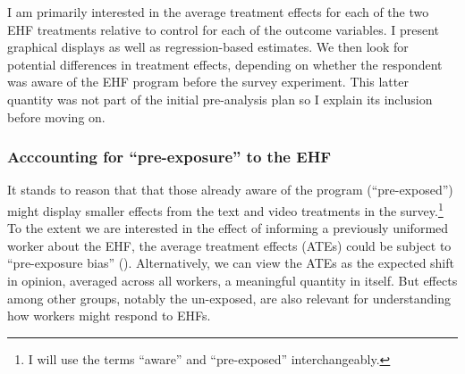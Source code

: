 \documentclass[
  11pt,
  oneside]{article}
\begin{document}
I am primarily interested in the average treatment effects for each of the two EHF treatments relative to control for each of the outcome variables. I present graphical displays as well as regression-based estimates. We then look for potential differences in treatment effects, depending on whether the respondent was aware of the EHF program before the survey experiment. This latter quantity was not part of the initial pre-analysis plan so I explain its inclusion before moving on.

\subsubsection{Acccounting for ``pre-exposure'' to the EHF}\label{acccounting-for-pre-exposure-to-the-ehf}

It stands to reason that that those already aware of the program (``pre-exposed'') might display smaller effects from the text and video treatments in the survey.\footnote{I will use the terms ``aware'' and ``pre-exposed'' interchangeably.} To the extent we are interested in the effect of informing a previously uniformed worker about the EHF, the average treatment effects (ATEs) could be subject to ``pre-exposure bias'' (). Alternatively, we can view the ATEs as the expected shift in opinion, averaged across all workers, a meaningful quantity in itself. But effects among other groups, notably the un-exposed, are also relevant for understanding how workers might respond to EHFs.
\end{document}
